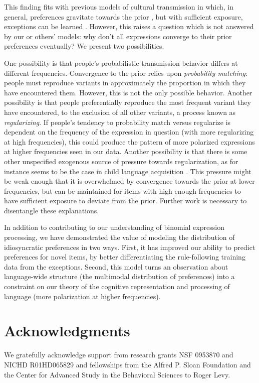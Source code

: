 \documentclass[10pt,letterpaper]{article}
\begin{document}
This finding fits with previous models of cultural transmission in which, in general, preferences gravitate towards the prior \citep{Griffiths:2005wh}, but with sufficient exposure, exceptions can be learned \citep[e.g. irregular verbs;][]{Lieberman:2007bl}. However, this raises a question which is not answered by our or others' models: why don't all expressions converge to their prior preferences eventually? We present two possibilities.

One possibility is that people's probabilistic transmission behavior differs at different frequencies. Convergence to the prior relies upon \emph{probability matching}: people must reproduce variants in approximately the proportion in which they have encountered them. However, this is not the only possible behavior. Another possibility is that people preferentially reproduce the most frequent variant they have encountered, to the exclusion of all other variants, a process known as \emph{regularizing}. If people's tendency to probability match versus regularize is dependent on the frequency of the expression in question (with more regularizing at high frequencies), this could produce the pattern of more polarized expressions at higher frequencies seen in our data. Another possibility is that there is some other unspecified exogenous source of pressure towards regularization, as for instance seems to be the case in child language acquisition \citep{HudsonKam:2009vx}. This pressure might be weak enough that it is overwhelmed by convergence towards the prior at lower frequencies, but can be maintained for items with high enough frequencies to have sufficient exposure to deviate from the prior. Further work is necessary to disentangle these explanations.

In addition to contributing to our understanding of binomial expression processing, we have demonstrated the value of modeling the distribution of idiosyncratic preferences in two ways. First, it has improved our ability to predict preferences for novel items, by better differentiating the rule-following training data from the exceptions. Second, this model turns an observation about language-wide structure (the multimodal distribution of preferences) into a constraint on our theory of the cognitive representation and processing of language (more polarization at higher frequencies).

\section{Acknowledgments}
We gratefully acknowledge support from research grants NSF 0953870 and NICHD R01HD065829 and fellowships from the Alfred P. Sloan Foundation and the Center for Advanced Study in the Behavioral Sciences to Roger Levy.



\setlength{\bibleftmargin}{.125in}
\setlength{\bibindent}{3in}


\end{document}
